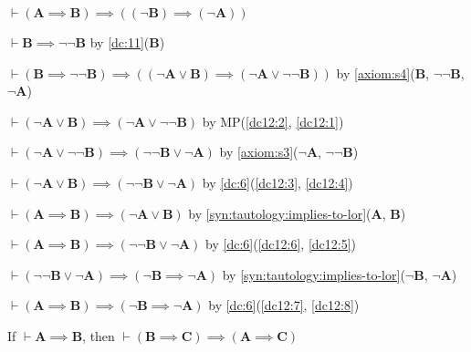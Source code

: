\documentclass{amsart}%
\newcommand\metavariable[1]{\boldsymbol{#1}}
\begin{document}
\begin{dc}\label{dc:12}
$\vdash(\metavariable{A}\implies\metavariable{B})\implies((\neg\metavariable{B})\implies(\neg\metavariable{A}))$
\end{dc}
\begin{pf}
\item\label{dc12:1} $\vdash\metavariable{B}\implies\neg\neg\metavariable{B}$
  by \ref{dc:11}($\metavariable{B}$)
\item\label{dc12:2} $\vdash(\metavariable{B}\implies\neg\neg\metavariable{B})\implies((\neg\metavariable{A}\lor\metavariable{B})\implies(\neg\metavariable{A}\lor\neg\neg\metavariable{B}))$
  by \ref{axiom:s4}($\metavariable{B}$, $\neg\neg\metavariable{B}$, $\neg\metavariable{A}$)
\item\label{dc12:3} $\vdash(\neg\metavariable{A}\lor\metavariable{B})\implies(\neg\metavariable{A}\lor\neg\neg\metavariable{B})$
  by MP(\ref{dc12:2}, \ref{dc12:1})
\item\label{dc12:4} $\vdash(\neg\metavariable{A}\lor\neg\neg\metavariable{B})\implies(\neg\neg\metavariable{B}\lor\neg\metavariable{A})$
  by \ref{axiom:s3}($\neg\metavariable{A}$, $\neg\neg\metavariable{B}$)
\item\label{dc12:5} $\vdash(\neg\metavariable{A}\lor\metavariable{B})\implies(\neg\neg\metavariable{B}\lor\neg\metavariable{A})$
  by \ref{dc:6}(\ref{dc12:3}, \ref{dc12:4})
\item\label{dc12:6} $\vdash(\metavariable{A}\implies\metavariable{B})\implies(\neg\metavariable{A}\lor\metavariable{B})$
  by \ref{syn:tautology:implies-to-lor}($\metavariable{A}$, $\metavariable{B}$)
\item\label{dc12:7} $\vdash(\metavariable{A}\implies\metavariable{B})\implies(\neg\neg\metavariable{B}\lor\neg\metavariable{A})$
  by \ref{dc:6}(\ref{dc12:6}, \ref{dc12:5})
\item\label{dc12:8} $\vdash(\neg\neg\metavariable{B}\lor\neg\metavariable{A})\implies(\neg\metavariable{B}\implies\neg\metavariable{A})$
  by \ref{syn:tautology:implies-to-lor}($\neg\metavariable{B}$, $\neg\metavariable{A}$)
\item $\vdash(\metavariable{A}\implies\metavariable{B})\implies(\neg\metavariable{B}\implies\neg\metavariable{A})$
  by \ref{dc:6}(\ref{dc12:7}, \ref{dc12:8})
\end{pf}

\begin{dc}\label{dc:13}
If $\vdash\metavariable{A}\implies\metavariable{B}$,
then $\vdash(\metavariable{B}\implies\metavariable{C})\implies(\metavariable{A}\implies\metavariable{C})$
\end{dc}
\end{document}
